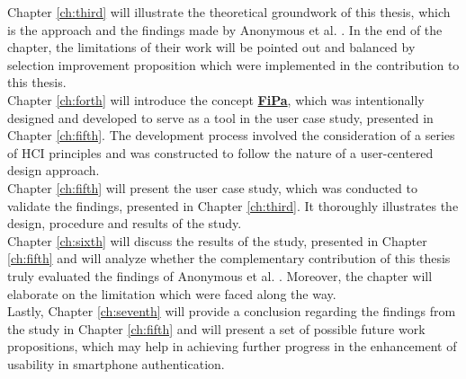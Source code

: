 Chapter \ref{ch:third} will illustrate the theoretical groundwork of this thesis, which is the approach and the findings made by Anonymous et al. \cite{anonymous}. In the end of the chapter, the limitations of their work will be pointed out and balanced by selection improvement proposition which were implemented in the contribution to this thesis.\\

Chapter \ref{ch:forth} will introduce the concept \underline{\textbf{FiPa}}, which was intentionally designed and developed to serve as a tool in the user case study, presented in Chapter \ref{ch:fifth}. The development process involved the consideration of a series of HCI principles and was constructed to follow the nature of a user-centered design approach. \\

Chapter \ref{ch:fifth} will present the user case study, which was conducted to validate the findings, presented in Chapter \ref{ch:third}.
It thoroughly illustrates the design, procedure and results of the study.\\

Chapter \ref{ch:sixth} will discuss the results of the study, presented in Chapter \ref{ch:fifth} and will analyze whether the complementary contribution of this thesis truly evaluated the findings of Anonymous et al. \cite{anonymous}. Moreover, the chapter will elaborate on the limitation which were faced along the way. \\
 
Lastly, Chapter \ref{ch:seventh} will provide a conclusion regarding the findings from the study in Chapter \ref{ch:fifth} and will present a set of possible future work propositions, which may help in achieving further progress in the enhancement of usability in smartphone authentication.






